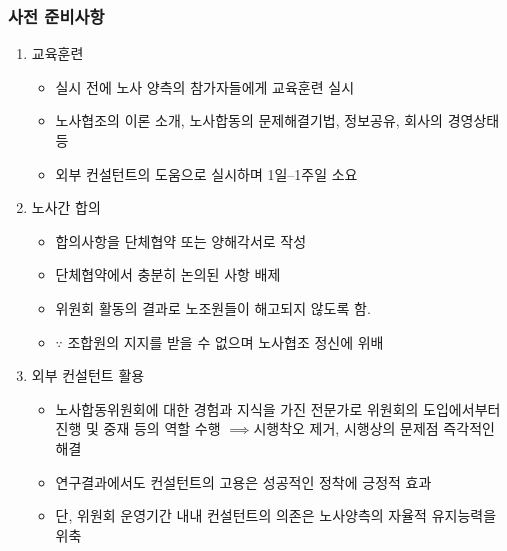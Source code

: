 \documentclass[aspectratio=169,xcolor=dvipsnames,handout]{beamer}
\begin{document}
\begin{frame}[allowframebreaks]
    \frametitle{사전 준비사항}
    \begin{enumerate}[<+->]
        \item 교육훈련
        \begin{itemize}[<+->]
            \item 실시 전에 노사 양측의 참가자들에게 교육훈련 실시
            \item 노사협조의 이론 소개, 노사합동의 문제해결기법, 정보공유, 회사의 경영상태 등
            \item 외부 컨설턴트의 도움으로 실시하며 1일--1주일 소요
        \end{itemize}
        \item 노사간 합의
        \begin{itemize}[<+->]
            \item 합의사항을 단체협약 또는 양해각서로 작성
            \item 단체협약에서 충분히 논의된 사항 배제
            \item 위원회 활동의 결과로 노조원들이 해고되지 않도록 함. 
            \item $\because$ 조합원의 지지를 받을 수 없으며 노사협조 정신에 위배
        \end{itemize}
    \framebreak\relax
        \item 외부 컨설턴트 활용
        \begin{itemize}[<+->]
            \item 노사합동위원회에 대한 경험과 지식을 가진 전문가로 위원회의 도입에서부터 진행 및 중재 등의 역할 수행 $\implies$시행착오 제거, 시행상의 문제점 즉각적인 해결
            \item 연구결과에서도 컨설턴트의 고용은 성공적인 정착에 긍정적 효과
            \item 단, 위원회 운영기간 내내 컨설턴트의 의존은 노사양측의 자율적 유지능력을 위축
        \end{itemize}
    \end{enumerate}
\end{frame}
\end{document}
